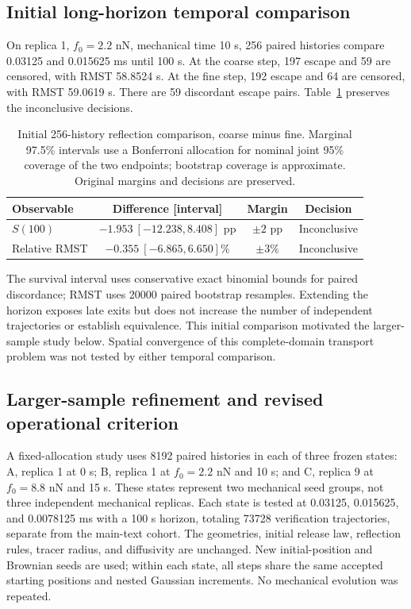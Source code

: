 \documentclass[a4paper,10pt]{article}
\numberwithin{equation}{section}
\begin{document}
\subsection*{Initial long-horizon temporal comparison}
On replica 1, $f_0=2.2$ nN, mechanical time 10 s, 256 paired histories compare 0.03125 and 0.015625 ms until 100 s. At the coarse step, 197 escape and 59 are censored, with RMST 58.8524 s. At the fine step, 192 escape and 64 are censored, with RMST 59.0619 s. There are 59 discordant escape pairs. Table~\ref{tab:reflection-equivalence} preserves the inconclusive decisions.

\begin{table}[htbp]
\centering\small
\caption{Initial 256-history reflection comparison, coarse minus fine. Marginal 97.5\% intervals use a Bonferroni allocation for nominal joint 95\% coverage of the two endpoints; bootstrap coverage is approximate. Original margins and decisions are preserved.}\label{tab:reflection-equivalence}
\begin{tabular}{@{}lccc@{}}
\toprule
Observable & Difference [interval] & Margin & Decision \\ \midrule
$S(100)$ & $-1.953\ [-12.238,8.408]$ pp & $\pm2$ pp & Inconclusive \\
Relative RMST & $-0.355\ [-6.865,6.650]\%$ & $\pm3\%$ & Inconclusive \\
\bottomrule
\end{tabular}
\end{table}
The survival interval uses conservative exact binomial bounds for paired discordance; RMST uses 20000 paired bootstrap resamples. Extending the horizon exposes late exits but does not increase the number of independent trajectories or establish equivalence. This initial comparison motivated the larger-sample study below. Spatial convergence of this complete-domain transport problem was not tested by either temporal comparison.

\subsection*{Larger-sample refinement and revised operational criterion}
A fixed-allocation study uses 8192 paired histories in each of three frozen states: A, replica 1 at 0 s; B, replica 1 at $f_0=2.2$ nN and 10 s; and C, replica 9 at $f_0=8.8$ nN and 15 s. These states represent two mechanical seed groups, not three independent mechanical replicas. Each state is tested at 0.03125, 0.015625, and 0.0078125 ms with a 100 s horizon, totaling 73728 verification trajectories, separate from the main-text cohort. The geometries, initial release law, reflection rules, tracer radius, and diffusivity are unchanged. New initial-position and Brownian seeds are used; within each state, all steps share the same accepted starting positions and nested Gaussian increments. No mechanical evolution was repeated.
\end{document}
